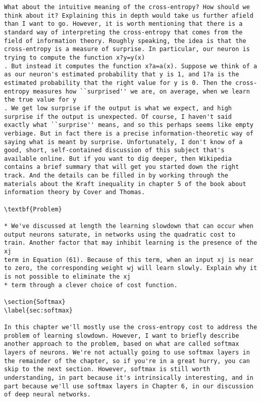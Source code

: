 \begin{lstlisting}
What about the intuitive meaning of the cross-entropy? How should we think about it? Explaining this in depth would take us further afield than I want to go. However, it is worth mentioning that there is a standard way of interpreting the cross-entropy that comes from the field of information theory. Roughly speaking, the idea is that the cross-entropy is a measure of surprise. In particular, our neuron is trying to compute the function x?y=y(x)
. But instead it computes the function x?a=a(x). Suppose we think of a as our neuron's estimated probability that y is 1, and 1?a is the estimated probability that the right value for y is 0. Then the cross-entropy measures how ``surprised'' we are, on average, when we learn the true value for y
. We get low surprise if the output is what we expect, and high surprise if the output is unexpected. Of course, I haven't said exactly what ``surprise'' means, and so this perhaps seems like empty verbiage. But in fact there is a precise information-theoretic way of saying what is meant by surprise. Unfortunately, I don't know of a good, short, self-contained discussion of this subject that's available online. But if you want to dig deeper, then Wikipedia contains a brief summary that will get you started down the right track. And the details can be filled in by working through the materials about the Kraft inequality in chapter 5 of the book about information theory by Cover and Thomas.

\textbf{Problem}

* We've discussed at length the learning slowdown that can occur when output neurons saturate, in networks using the quadratic cost to train. Another factor that may inhibit learning is the presence of the xj
term in Equation (61). Because of this term, when an input xj is near to zero, the corresponding weight wj will learn slowly. Explain why it is not possible to eliminate the xj
* term through a clever choice of cost function. 

\section{Softmax}
\label{sec:softmax}

In this chapter we'll mostly use the cross-entropy cost to address the problem of learning slowdown. However, I want to briefly describe another approach to the problem, based on what are called softmax layers of neurons. We're not actually going to use softmax layers in the remainder of the chapter, so if you're in a great hurry, you can skip to the next section. However, softmax is still worth understanding, in part because it's intrinsically interesting, and in part because we'll use softmax layers in Chapter 6, in our discussion of deep neural networks.


\end{lstlisting}
